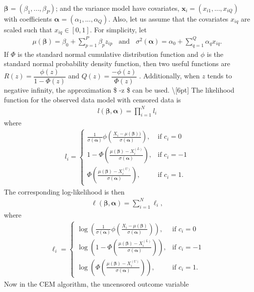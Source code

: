 \documentclass[
]{jss}
\begin{document}
\(\bm{\beta}_{}=(\beta_{1}, ...,\beta_{P})\); and the variance model
have covariates, \(\bm{x}_{i} = (x_{i1}, ..., x_{iQ})\) with
coefficients \(\bm{\alpha}_{} = (\alpha_{1}, ..., \alpha_{Q})\). Also,
let us assume that the covariates \(x_{iq}\) are scaled such that
\(x_{iq} \in [0,1]\). For simplicity, let \begin{align*}
\mu(\bm{\beta})=\beta_0+\sum\limits_{p=1}^P \beta_p z_{ip} ~~~~ \text{and} ~~~~
  \sigma^2(\bm{\alpha})=\alpha_0+\sum\limits_{q=1}^Q \alpha_q x_{iq}.
\end{align*} If \(\Phi\) is the standard normal cumulative distribution
function and \(\phi\) is the standard normal probability density
function, then two useful functions are
\(R(z)=\dfrac{\phi(z)}{1-\Phi(z)}\) and
\(Q(z)=\dfrac{-\phi(z)}{\Phi(z)}\) \citep{Mills1926}. Additionally, when
\(z\) tends to negative infinity, the approximation
\$ \approx -z \$ can be used.
\textbackslash{[}6pt{]} The likelihood function for the observed data
model with censored data is \begin{align*}
l(\bm{\beta, \alpha}) = \prod_{i=1}^{N} l_i
\end{align*} where \begin{align*}
l_i = 
  \begin{cases}
\displaystyle \frac{1}{\sigma(\bm{\alpha})} \phi \left( \frac{X_i-\mu(\bm{\beta}))}{\sigma(\bm{\alpha})} \right)  ,         & \text{if } c_i=0\\[10pt]
\displaystyle 1- \Phi \left( \frac{\mu(\bm{\beta}) - X_i^{(L)}}{\sigma(\bm{\alpha})} \right)  ,        & \text{if } c_i=-1\\[10pt]
\displaystyle \Phi \left( \frac{\mu(\bm{\beta}) - X_i^{(U)}}{\sigma(\bm{\alpha})} \right)  ,        & \text{if } c_i=1. 
\end{cases}
\end{align*} The corresponding log-likelihood is then \begin{align*}
\ell(\bm{\beta, \alpha}) =  \sum_{i=1}^{N} \ell_i, 
\end{align*} where \begin{align*}
\ell_i =
  \begin{cases}
\displaystyle \log \left( \frac{1}{\sigma(\bm{\alpha})} \phi \left( \frac{X_i- \mu(\bm{\beta})}{\sigma(\bm{\alpha})} \right)  \right),          & \text{if } c_i=0\\[10pt]
\displaystyle \log \left( 1- \Phi \left( \frac{\mu(\bm{\beta}) - X_i^{(L)}}{\sigma(\bm{\alpha})} \right) \right) ,        & \text{if } c_i=-1\\[10pt]
\displaystyle \log \left( \Phi \left( \frac{\mu(\bm{\beta}) - X_i^{(U)}}{\sigma(\bm{\alpha})} \right)  \right),        & \text{if } c_i=1. 
\end{cases}
\end{align*} Now in the CEM algorithm, the uncensored outcome variable
\end{document}
